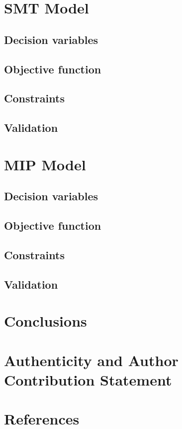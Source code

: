 \documentclass{article}
\begin{document}
\section{SMT Model}

\subsection{Decision variables}

\subsection{Objective function}

\subsection{Constraints}

\subsection{Validation}

\section{MIP Model}

\subsection{Decision variables}

\subsection{Objective function}

\subsection{Constraints}

\subsection{Validation}

\section{Conclusions}

\section{Authenticity and Author Contribution Statement}

\section{References}
\end{document}
